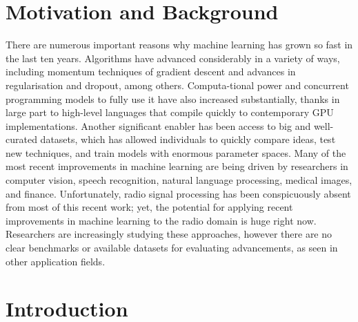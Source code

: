 \documentclass[12pt,a4paper]{article}
\begin{document}
    \newpage

    \section{Motivation and Background}
    There are numerous important reasons why machine learning has grown so fast in the last ten years. Algorithms have advanced considerably in a variety of ways, including momentum techniques of gradient descent and advances in regularisation and dropout, among others. Computa-tional power and concurrent programming models to fully use it have also increased substantially, thanks in large part to high-level languages that compile quickly to contemporary GPU implementations.\newline
    Another significant enabler has been access to big and well-curated datasets, which has allowed individuals to quickly compare ideas, test new techniques, and train models with enormous parameter spaces.\newline
    Many of the most recent improvements in machine learning are being driven by researchers in computer vision, speech recognition, natural language processing, medical images, and finance. Unfortunately, radio signal processing has been conspicuously absent from most of this recent work;\newline
    yet, the potential for applying recent improvements in machine learning to the radio domain is huge right now. Researchers are increasingly studying these approaches, however there are no clear benchmarks or available datasets for evaluating advancements, as seen in other application fields.
    \newpage
    
    \section{Introduction}
    
\end{document}
